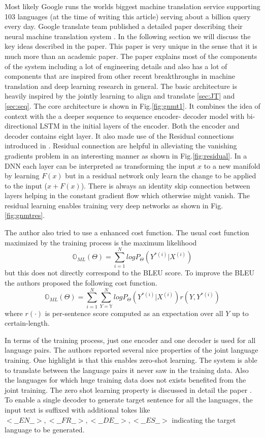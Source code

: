 \documentclass[a4paper]{article}
\begin{document}
Most  likely  Google  runs  the   worlds  biggest  machine  translation  service
supporting 103  languages (at the time of writing this  article) serving about a
billion query  every day.  Google translate  team  published  a  detailed  paper
describing their  neural machine translation  system \cite{wu2016google}. In the
following section we will discuss  the key ideas  described  in the  paper. This
paper is very unique in the  sense that  it is much more than an academic paper.
The  paper explains  most  of the components of  the system including  a  lot of
engineering  details and also has  a lot of  components  that are inspired  from
other recent breakthroughs  in machine translation and deep learning research in
general. The basic architecture is heavily inspired by the jointly  learning  to
align and  translate \ref{sec:JT}  and  \ref{sec:seq}. The  core architecture is
shown in Fig.\ref{fig:gnmt1}. It combines the  idea of context with the a deeper
sequence to  sequence encoder-  decoder  model with bi-directional LSTM  in  the
initial  layers of  the encoder. Both  the  encoder  and decoder  contains eight
layer.   It  also   made   use  of   the  Residual   connections  introduced  in
\cite{he2016deep}.  Residual connection are helpful in alleviating the vanishing
gradients problem in  an interesting  manner as shown in Fig.\ref{fig:residual}.
In a DNN each  layer can be interpreted as transforming the  input  $x$ to a new
manifold  by learning $F (x)$ but in a residual network only learn the change to
be  applied to  the  input  ($x + F  (x)$). There  is  always  an  identity skip
connection between layers helping in the  constant gradient flow which otherwise
might vanish. The residual learning enables training very deep networks as shown
in Fig.\ref{fig:gnmtres}.

The author  also tried to use a enhanced cost  function. The usual cost function
maximized   by    the    training    process   is    the    maximum   likelihood
$$\mathbb{O}_{ML}(\Theta) = \sum_{i=1}^N  log  P_\Theta  (Y^{*(i)} | X^{(i)}) $$
but this does not directly correspond to the BLEU score. To improve the BLEU the
authors  proposed  the  following  cost function. $$  \mathbb{O}_{ML}(\Theta)  =
\sum_{i=1}^N  \sum_{Y=\mathbb{Y}}^N  log  P_\Theta  (Y^{*(i)}  |  X^{(i)})  r(Y,
Y^{*(i)} ) $$ where $r (\cdot)$ is per-sentence score computed as an expectation
over all $Y$ up to certain-length.

In terms  of the training  process, just one encoder and one decoder is used for
all  language pairs. The authors reported  several nice properties of the  joint
language training. One  highlight  is that this  enables zero-shot learning. The
system  is able  to translate  between  the  language pairs it never  saw in the
training data. Also  the languages for which huge training data does  not exists
benefited from the joint training. The  zero shot learning property is discussed
in  detail  the paper  \cite{johnson2016google}.  To enable a  single decoder to
generate target sentence for all the languages, the input text is  suffixed with
additional  tokes like $<\_\_EN\_\_>,  <\_\_FR\_\_>, <\_\_DE\_\_>, <\_\_ES\_\_>$
indicating the target language to be generated.
\end{document}
